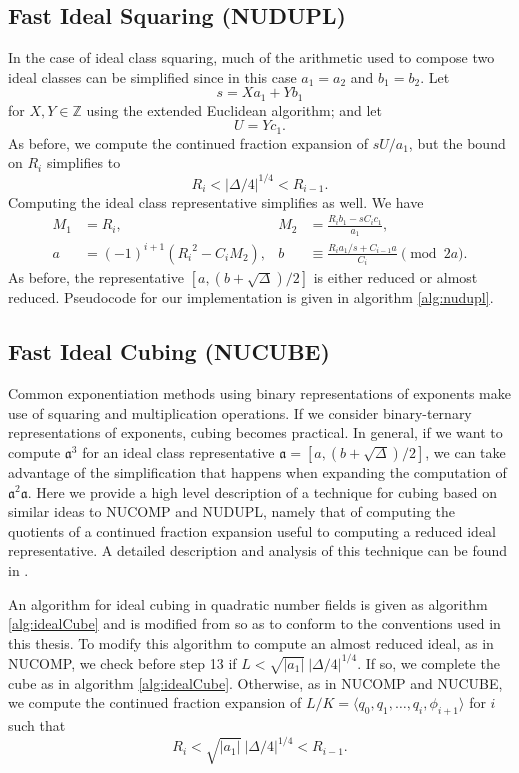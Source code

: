 \documentclass{ucalgthes1}
\theoremstyle{plain}
\theoremstyle{definition}
\newcommand{\ZZ}{\mathbb{Z}}
\begin{document}
\subsection{Fast Ideal Squaring (NUDUPL)}\label{subsec:nudupl}

In the case of ideal class squaring, much of the arithmetic used to compose two ideal classes can be simplified since in this case $a_1=a_2$ and $b_1=b_2$.  Let 
\[
	s = Xa_1 + Yb_1
\]
for $X,Y \in \ZZ$ using the extended Euclidean algorithm; and let 
\[
	U = Yc_1.
\]
As before, we compute the continued fraction expansion of $sU/a_1$, but the bound on $R_i$ simplifies to
\[
	R_i < |\Delta/4|^{1/4} < R_{i-1}.
\]
Computing the ideal class representative simplifies as well.  We have
\begin{align*}
	M_1 &= R_i, & 
	M_2 &= \frac{R_i b_1 - sC_i c_1}{a_1}, \\
	a &= (-1)^{i+1}({R_i}^2 - C_i M_2), &
	b &\equiv \frac{R_i a_1/s  + C_{i-1} a}{C_i} \pmod{2a}.
\end{align*}
As before, the representative $[a, (b+\sqrt\Delta)/2]$ is either reduced or almost reduced.  \break Pseudocode for our implementation is given in algorithm \ref{alg:nudupl}.


\subsection{Fast Ideal Cubing (NUCUBE)}\label{subsec:nucube}

Common exponentiation methods using binary representations of exponents make use of squaring and multiplication operations.  If we consider binary-ternary representations of exponents, cubing becomes practical.  In general, if we want to compute ${\mathfrak a}^3$ for an ideal class representative $\mathfrak a = [a, (b+\sqrt\Delta)/2]$, we can take advantage of the simplification that happens when expanding the computation of ${\mathfrak a}^2 \mathfrak a$.  Here we provide a high level description of a technique for cubing based on similar ideas to NUCOMP and NUDUPL, namely that of computing the quotients of a continued fraction expansion useful to computing a reduced ideal representative.  A detailed description and analysis of this technique can be found in \cite{Ijs2010}.


An algorithm for ideal cubing in quadratic number fields is given as algorithm \ref{alg:idealCube} and is modified from \cite[Appendix A, Algorithm 5]{Ijs2010} so as to conform to the conventions used in this thesis. To modify this algorithm to compute an almost reduced ideal, as in NUCOMP, we check before step 13 if $L < \sqrt{|a_1|} ~ |\Delta/4|^{1/4}$.  If so, we complete the cube as in algorithm \ref{alg:idealCube}.  Otherwise, as in NUCOMP and NUCUBE, we compute the continued fraction expansion of $L/K = \langle q_0, q_1, \dots, q_i, \phi_{i+1}\rangle$ for $i$ such that
\[
	R_i < \sqrt{|a_1|} ~ |\Delta/4|^{1/4} < R_{i-1}.
\]
\end{document}
